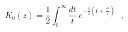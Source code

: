 \begin{equation}
 {\mathit {K}}_{0}(z) = \frac {1}{2} \int _{0}^{\infty} \frac{dt}{t}
 ~e^{-\frac {1}{2}(t + \frac {z^2}{t}) } ~~~,
\end{equation}

